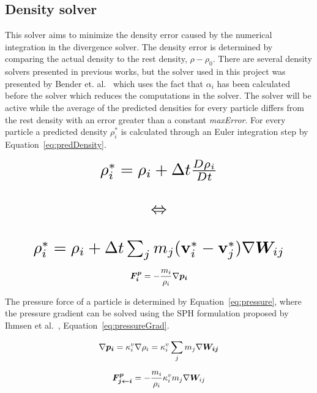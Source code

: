 \subsection{Density solver} \label{densitySolver}
    This solver aims to minimize the density error caused by the numerical integration in the divergence solver.
    The density error is determined by comparing the actual density to the rest density, $\rho - \rho_0$.
    There are several density solvers presented in previous works, but the solver used in this project was presented by Bender et. al.~\cite{bender} which uses the fact that $\alpha_i$ has been calculated before the solver which reduces the computations in the solver.
    The solver will be active while the average of the predicted densities for every particle differs from the rest density with an error greater than a constant \textit{maxError}.
    For every particle a predicted density $\rho_i^*$ is calculated through an Euler integration step by Equation~\ref{eq:predDensity}.

    \begin{equation} \label{eq:predDensity}
        \resizebox{0.85\linewidth}{!}{$
        \begin{matrix}
        \rho_i^* = \rho_i + \Delta t \frac{D\rho_i}{Dt} \\ 
        \\
        \Leftrightarrow \\ 
        \\
        \rho_i^* = \rho_i + \Delta t \sum_j m_j 
        (\textbf{v}_{i}^* - \textbf{v}_j^*) \nabla \vect{W}_{ij}
        \end{matrix}
        $}
    \end{equation}


    \begin{equation} \label{eq:pressure}
        \bm{F_i^p} = -\frac{m_i}{\rho_i}\nabla \bm{p_i}
    \end{equation}

    The pressure force of a particle is determined by Equation~\ref{eq:pressure}, where the pressure gradient can be solved using the SPH formulation proposed by Ihmsen et al.~\cite{ihmsen}, Equation~\ref{eq:pressureGrad}.

    \begin{equation} \label{eq:pressureGrad}
        \nabla \bm{p_i} = \kappa_i^v \nabla \rho_i = \kappa_i^v \sum_j m_j \nabla \bm{W_{ij}}
    \end{equation}

    \begin{equation} \label{eq:pressure2}
        \bm{F_{j\leftarrow i}^p} = -\frac{m_i}{\rho_i} \kappa_i^v m_j \nabla \bm{W}_{ij}
    \end{equation}


